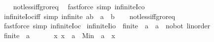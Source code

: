 \begin{isabellebody}
%
\isadelimproof
\ \ %
\endisadelimproof
%
\isatagproof
{}\isamarkupfalse%
\ not{\isacharunderscore}{\kern0pt}less{\isacharunderscore}{\kern0pt}iff{\isacharunderscore}{\kern0pt}gr{\isacharunderscore}{\kern0pt}or{\isacharunderscore}{\kern0pt}eq\ \isamarkupfalse%
\ {\isacharparenleft}{\kern0pt}fastforce\ simp{\isacharcolon}{\kern0pt}\ infinite{\isacharunderscore}{\kern0pt}Ico{\isacharparenright}{\kern0pt}%
\endisatagproof
{\isafoldproof}%
%
\isadelimproof
\isanewline
%
\endisadelimproof
\isanewline
{}\isamarkupfalse%
\ infinite{\isacharunderscore}{\kern0pt}Ioc{\isacharunderscore}{\kern0pt}iff\ {\isacharbrackleft}{\kern0pt}simp{\isacharbrackright}{\kern0pt}{\isacharcolon}{\kern0pt}\ {\isachardoublequoteopen}infinite\ {\isacharbraceleft}{\kern0pt}a{\isacharless}{\kern0pt}{\isachardot}{\kern0pt}{\isachardot}{\kern0pt}b{\isacharbraceright}{\kern0pt}\ {\isasymlongleftrightarrow}\ a\ {\isacharless}{\kern0pt}\ b{\isachardoublequoteclose}\isanewline
%
\isadelimproof
\ \ %
\endisadelimproof
%
\isatagproof
{}\isamarkupfalse%
\ not{\isacharunderscore}{\kern0pt}less{\isacharunderscore}{\kern0pt}iff{\isacharunderscore}{\kern0pt}gr{\isacharunderscore}{\kern0pt}or{\isacharunderscore}{\kern0pt}eq\ \isamarkupfalse%
\ {\isacharparenleft}{\kern0pt}fastforce\ simp{\isacharcolon}{\kern0pt}\ infinite{\isacharunderscore}{\kern0pt}Ioc{\isacharparenright}{\kern0pt}%
\endisatagproof
{\isafoldproof}%
%
\isadelimproof
\isanewline
%
\endisadelimproof
\isanewline
{}\isamarkupfalse%
\isanewline
\isanewline
{}\isamarkupfalse%
\ infinite{\isacharunderscore}{\kern0pt}Iio{\isacharcolon}{\kern0pt}\ {\isachardoublequoteopen}{\isasymnot}\ finite\ {\isacharbraceleft}{\kern0pt}{\isachardot}{\kern0pt}{\isachardot}{\kern0pt}{\isacharless}{\kern0pt}\ a\ {\isacharcolon}{\kern0pt}{\isacharcolon}{\kern0pt}\ {\isacharprime}{\kern0pt}a\ {\isacharcolon}{\kern0pt}{\isacharcolon}{\kern0pt}\ {\isacharbraceleft}{\kern0pt}no{\isacharunderscore}{\kern0pt}bot{\isacharcomma}{\kern0pt}\ linorder{\isacharbraceright}{\kern0pt}{\isacharbraceright}{\kern0pt}{\isachardoublequoteclose}\isanewline
%
\isadelimproof
%
\endisadelimproof
%
\isatagproof
{}\isamarkupfalse%
\isanewline
\ \ \isamarkupfalse%
\ {\isachardoublequoteopen}finite\ {\isacharbraceleft}{\kern0pt}{\isachardot}{\kern0pt}{\isachardot}{\kern0pt}{\isacharless}{\kern0pt}\ a{\isacharbraceright}{\kern0pt}{\isachardoublequoteclose}\isanewline
\ \ \isamarkupfalse%
\ \isamarkupfalse%
\ {\isacharasterisk}{\kern0pt}{\isacharcolon}{\kern0pt}\ {\isachardoublequoteopen}{\isasymAnd}x{\isachardot}{\kern0pt}\ x\ {\isacharless}{\kern0pt}\ a\ {\isasymLongrightarrow}\ Min\ {\isacharbraceleft}{\kern0pt}{\isachardot}{\kern0pt}{\isachardot}{\kern0pt}{\isacharless}{\kern0pt}\ a{\isacharbraceright}{\kern0pt}\ {\isasymle}\ x{\isachardoublequoteclose}\isanewline

\end{isabellebody}
